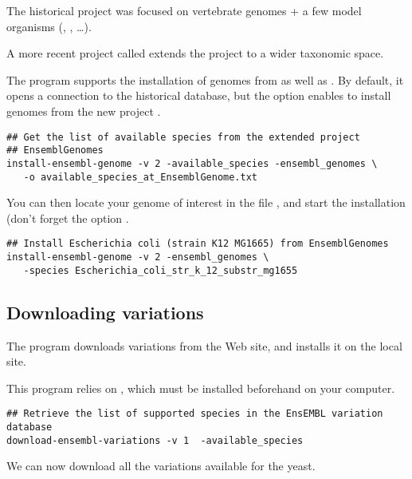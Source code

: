 The historical \ensembl project 
was focused on vertebrate genomes + a few model organisms
(, ,
\ldots).

A more recent project called \ensemblgenomes
{} extends the \ensembl project to a
wider taxonomic space.

The program  supports the installation
of genomes from \ensembl as well as \ensemblgenomes. By default, it
opens a connection to the historical \ensembl database, but the option
 enables to install genomes from the new
project \ensemblgenomes.

\begin{lstlisting}
## Get the list of available species from the extended project
## EnsemblGenomes
install-ensembl-genome -v 2 -available_species -ensembl_genomes \
   -o available_species_at_EnsemblGenome.txt
\end{lstlisting}

You can then locate your genome of interest in the file
, and start the
installation (don't forget the option \option{-ensembl\_genomes}.

\begin{lstlisting}
## Install Escherichia coli (strain K12 MG1665) from EnsemblGenomes
install-ensembl-genome -v 2 -ensembl_genomes \
   -species Escherichia_coli_str_k_12_substr_mg1655
\end{lstlisting}


\subsection{Downloading variations}

The program  downloads variations
from the \ensembl Web site, and installs it on the local \RSAT
site. 

This program relies on , which must be installed
beforehand on your computer.

\begin{lstlisting}
## Retrieve the list of supported species in the EnsEMBL variation database
download-ensembl-variations -v 1  -available_species
\end{lstlisting}

We can now download all the variations available for the yeast.


